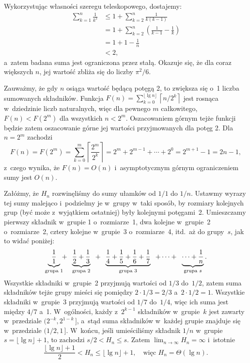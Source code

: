 
\exercise %
Wykorzystując własności szeregu teleskopowego, dostajemy:
\begin{align*}
	\sum_{k=1}^n\frac{1}{k^2} &\le 1+\sum_{k=2}^n\frac{1}{k(k-1)} \\
	&= 1+\sum_{k=2}^n\left(\frac{1}{k-1}-\frac{1}{k}\right) \\
	&= 1+1-\frac{1}{n} \\
	&< 2,
\end{align*}
a~zatem badana suma jest ograniczona przez stałą. Okazuje się, że dla coraz większych $n$, jej wartość zbliża się do liczby $\pi^2\!/6$.

\exercise %
Zauważmy, że gdy $n$ osiąga wartość będącą potęgą 2, to zwiększa się o~1 liczba sumowanych składników. Funkcja $F(n)=\sum_{k=0}^{\lfloor\lg n\rfloor}\left\lceil n/2^k\right\rceil$ jest rosnąca w~dziedzinie liczb naturalnych, więc dla pewnego $m$ całkowitego, $F(n)<F(2^m)$ dla wszystkich $n<2^m$. Oszacowaniem górnym tejże funkcji będzie zatem oszacowanie górne jej wartości przyjmowanych dla potęg 2. Dla $n=2^m$ zachodzi
\[
	F(n) = F(2^m) = \sum_{k=0}^m\left\lceil\frac{2^m}{2^k}\right\rceil = 2^m+2^{m-1}+\cdots+2^0 = 2^{m+1}-1 = 2n-1,
\]
z~czego wynika, że $F(n)=O(n)$ i~asymptotycznym górnym ograniczeniem sumy jest $O(n)$.

\exercise %
Załóżmy, że $H_n$ rozwinęliśmy do sumy ułamków od $1/1$ do $1/n$. Ustawmy wyrazy tej sumy malejąco i~podzielmy je w~grupy w~taki sposób, by rozmiary kolejnych grup (być może z~wyjątkiem ostatniej) były kolejnymi potęgami~2. Umieszczamy pierwszy składnik w~grupie 1 o~rozmiarze~1, dwa kolejne w~grupie~2 o~rozmiarze~2, cztery kolejne w~grupie~3 o~rozmiarze~4, itd.\ aż do grupy~$s$, jak to widać poniżej:
\[
	\underbrace{\frac{1}{1}}_{\text{\scriptsize grupa 1}}\!\!+\;\;\underbrace{\frac{1}{2}+\frac{1}{3}}_{\text{\scriptsize grupa 2}}\;\;+\;\;\underbrace{\frac{1}{4}+\frac{1}{5}+\frac{1}{6}+\frac{1}{7}}_{\text{\scriptsize grupa 3}}\;\;+\cdots+\;\;\underbrace{\cdots +\frac{1}{n}}_{\text{\scriptsize grupa $s$}}.
\]
Wszystkie składniki w~grupie~2 przyjmują wartości od $1/3$ do~$1/2$, zatem suma składników tejże grupy mieści się pomiędzy $2\cdot1/3=2/3$ a~$2\cdot1/2=1$. Wszystkie składniki w~grupie~3 przyjmują wartości od $1/7$ do~$1/4$, więc ich suma jest między $4/7$ a~1. W~ogólności, każdy z~$2^{k-1}$ składników w~grupie~$k$ jest zawarty w~przedziale $\bigl(2^{-k},2^{1-k}\,\bigr]$, a~stąd suma składników w~każdej grupie znajduje się w~przedziale $(1/2,1\,]$. W~końcu, jeśli umieściliśmy składnik $1/n$ w~grupie $s = \lfloor\lg n\rfloor+1$, to zachodzi $s/2<H_n\le s$. Zatem $\lim_{n\to\infty}H_n=\infty$ i~istotnie
\[
	\frac{\lfloor\lg n\rfloor+1}{2} < H_n \le \lfloor\lg n\rfloor+1, \quad\text{więc $H_n=\Theta(\lg n)$}.
\]

